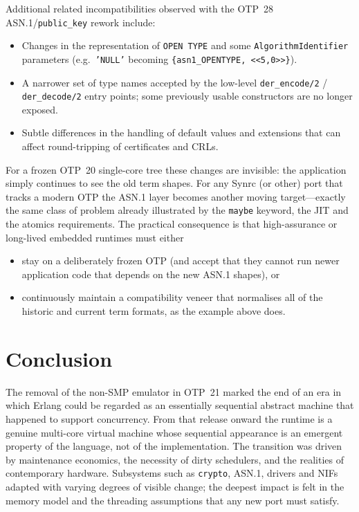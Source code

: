 \documentclass{article}
\begin{document}
Additional related incompatibilities observed with the OTP~28 ASN.1/\texttt{public\_key} rework include:

\begin{itemize}
  \item Changes in the representation of \texttt{OPEN TYPE} and some \texttt{AlgorithmIdentifier} parameters (e.g.\ \texttt{'NULL'} becoming \texttt{\{asn1\_OPENTYPE, <<5,0>>\}}).
  \item A narrower set of type names accepted by the low-level \texttt{der\_encode/2} / \texttt{der\_decode/2} entry points; some previously usable constructors are no longer exposed.
  \item Subtle differences in the handling of default values and extensions that can affect round-tripping of certificates and CRLs.
\end{itemize}

For a frozen OTP~20 single-core tree these changes are invisible: the application simply continues to see the old term shapes.
For any Synrc (or other) port that tracks a modern OTP the ASN.1 layer becomes another moving target---exactly the same class of problem already illustrated by the \texttt{maybe} keyword, the JIT and the atomics requirements.
The practical consequence is that high-assurance or long-lived embedded runtimes must either

\begin{itemize}
  \item stay on a deliberately frozen OTP (and accept that they cannot run newer application code that depends on the new ASN.1 shapes), or
  \item continuously maintain a compatibility veneer that normalises all of the historic and current term formats, as the example above does.
\end{itemize}

\section{Conclusion}

The removal of the non-SMP emulator in OTP~21 marked the end of an era in which Erlang could be regarded as an essentially sequential abstract machine that happened to support concurrency.
From that release onward the runtime is a genuine multi-core virtual machine whose sequential appearance is an emergent property of the language, not of the implementation.
The transition was driven by maintenance economics, the necessity of dirty schedulers, and the realities of contemporary hardware.
Subsystems such as \texttt{crypto}, ASN.1, drivers and NIFs adapted with varying degrees of visible change; the deepest impact is felt in the memory model and the threading assumptions that any new port must satisfy.
\end{document}
